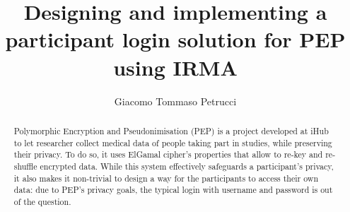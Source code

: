 \documentclass{report}
\begin{document}
\title{Designing and implementing a participant login solution for PEP using IRMA}
\author{Giacomo Tommaso Petrucci}
\maketitle

\begin{abstract}
	Polymorphic Encryption and Pseudonimisation (PEP) is a project developed at iHub to let researcher collect medical data of people taking part in studies, while preserving their 
	privacy. To do so, it uses ElGamal cipher's properties that allow to re-key and re-shuffle encrypted data. While this system effectively safeguards a participant's privacy, it 
	also makes it non-trivial to design a way for the participants to access their own data: due to PEP's privacy goals, the typical login with username and password is out of the
	question. 
\end{abstract}
\end{document}
